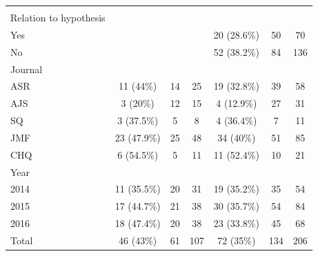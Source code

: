 \documentclass[
  12pt,
]{article}
\begin{document}
\begin{longtable}[t]{lcccccc}
\endfoot
\bottomrule
\endlastfoot
\addlinespace[0.3em]
\multicolumn{7}{l}{\textbf{‘AllP'}}\\
\hspace{1em}Relation to hypothesis &  &  &  &  &  & \\
\hspace{1em}\hspace{1em}Yes &  &  &  & 20 (28.6\%) & 50 & 70\\
\hspace{1em}\hspace{1em}No &  &  &  & 52 (38.2\%) & 84 & 136\\
\hspace{1em}Journal &  &  &  &  &  \vphantom{1} & \\
\hspace{1em}\hspace{1em}ASR & 11 (44\%) & 14 & 25 & 19 (32.8\%) & 39 & 58\\
\hspace{1em}\hspace{1em}AJS & 3 (20\%) & 12 & 15 & 4 (12.9\%) & 27 & 31\\
\hspace{1em}\hspace{1em}SQ & 3 (37.5\%) & 5 & 8 & 4 (36.4\%) & 7 & 11\\
\hspace{1em}\hspace{1em}JMF & 23 (47.9\%) & 25 & 48 & 34 (40\%) & 51 & 85\\
\hspace{1em}\hspace{1em}CHQ & 6 (54.5\%) & 5 & 11 & 11 (52.4\%) & 10 & 21\\
\hspace{1em}Year &  &  &  &  &  \vphantom{1} & \\
\hspace{1em}\hspace{1em}2014 & 11 (35.5\%) & 20 & 31 & 19 (35.2\%) & 35 & 54\\
\hspace{1em}\hspace{1em}2015 & 17 (44.7\%) & 21 & 38 & 30 (35.7\%) & 54 & 84\\
\hspace{1em}\hspace{1em}2016 & 18 (47.4\%) & 20 & 38 & 23 (33.8\%) & 45 & 68\\
\hspace{1em}Total & 46 (43\%) & 61 & 107 & 72 (35\%) & 134 & 206\\

\end{longtable}
\end{document}
